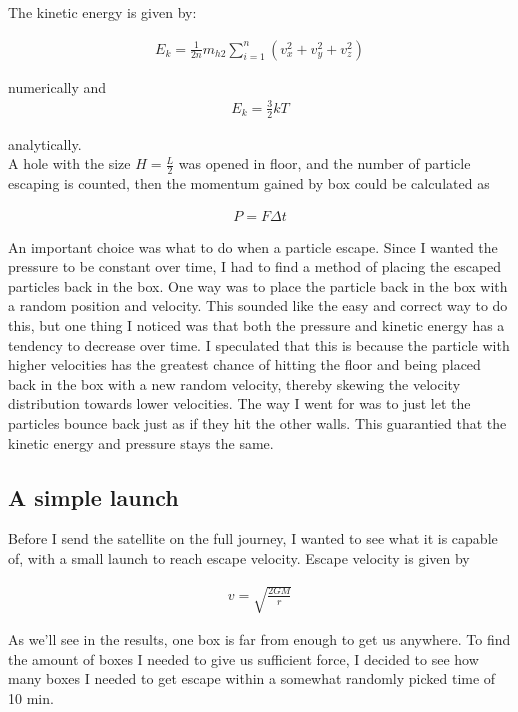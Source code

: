 \documentclass[a4paper, 10pt]{article}
\begin{document}
The kinetic energy is given by:

\begin{align}
E_k = \frac{1}{2n}m_{h2}\sum\limits_{i=1}^{n}(v_x^{2} + v_y^{2} + v_z^{2})
\end{align}

numerically and
\begin{align}
 E_k = \frac{3}{2}kT
\end{align}

analytically. \\

A hole with the size $H =\frac{L}{2}$ was opened in floor, and the number of particle escaping is counted, then the momentum gained by box could be  calculated as

\begin{align}
P = F \Delta t
\end{align}

An important choice was what to do when a particle escape. Since I wanted the pressure to be constant over time, I had to find a method of placing the escaped particles back in the box. One way was to place the particle back in the box with a random position and velocity. This sounded like the easy and correct way to do this, but one thing I noticed was that both the pressure and kinetic energy has a tendency to decrease over time. I speculated that this is because the particle with higher velocities has the greatest chance of hitting the floor and being placed back in the box with a new random velocity, thereby skewing the velocity distribution towards lower velocities. The way I went for was to just let the particles bounce back just as if they hit the other walls. This guarantied that the kinetic energy and pressure stays the same. 

\subsection{A simple launch}

Before I send the satellite on the full journey, I wanted to see what it is capable of, with a small launch to reach escape velocity. Escape velocity is given by 

\begin{align}\label{eq:escape}
v = \sqrt{\frac{2GM}{r}}
\end{align}

As we'll see in the results, one box is far from enough to get us anywhere. To find the amount of boxes I needed to give us sufficient force, I decided to see how many boxes I needed to get escape within a somewhat randomly picked time of 10 min.
\end{document}

